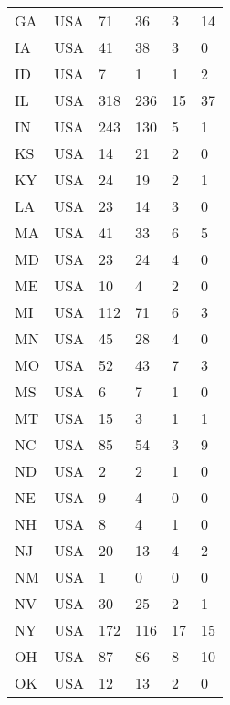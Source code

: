 \begin{supertabular}{p{0.3\columnwidth}p{0.3\columnwidth}p{0.05\columnwidth}p{0.05\columnwidth}p{0.05\columnwidth}p{0.05\columnwidth}}
            GA &              USA &   71 &   36 &   3 &  14 \\
            IA &              USA &   41 &   38 &   3 &   0 \\
            ID &              USA &    7 &    1 &   1 &   2 \\
            IL &              USA &  318 &  236 &  15 &  37 \\
            IN &              USA &  243 &  130 &   5 &   1 \\
            KS &              USA &   14 &   21 &   2 &   0 \\
            KY &              USA &   24 &   19 &   2 &   1 \\
            LA &              USA &   23 &   14 &   3 &   0 \\
            MA &              USA &   41 &   33 &   6 &   5 \\
            MD &              USA &   23 &   24 &   4 &   0 \\
            ME &              USA &   10 &    4 &   2 &   0 \\
            MI &              USA &  112 &   71 &   6 &   3 \\
            MN &              USA &   45 &   28 &   4 &   0 \\
            MO &              USA &   52 &   43 &   7 &   3 \\
            MS &              USA &    6 &    7 &   1 &   0 \\
            MT &              USA &   15 &    3 &   1 &   1 \\
            NC &              USA &   85 &   54 &   3 &   9 \\
            ND &              USA &    2 &    2 &   1 &   0 \\
            NE &              USA &    9 &    4 &   0 &   0 \\
            NH &              USA &    8 &    4 &   1 &   0 \\
            NJ &              USA &   20 &   13 &   4 &   2 \\
            NM &              USA &    1 &    0 &   0 &   0 \\
            NV &              USA &   30 &   25 &   2 &   1 \\
            NY &              USA &  172 &  116 &  17 &  15 \\
            OH &              USA &   87 &   86 &   8 &  10 \\
            OK &              USA &   12 &   13 &   2 &   0 \\

\end{supertabular}

